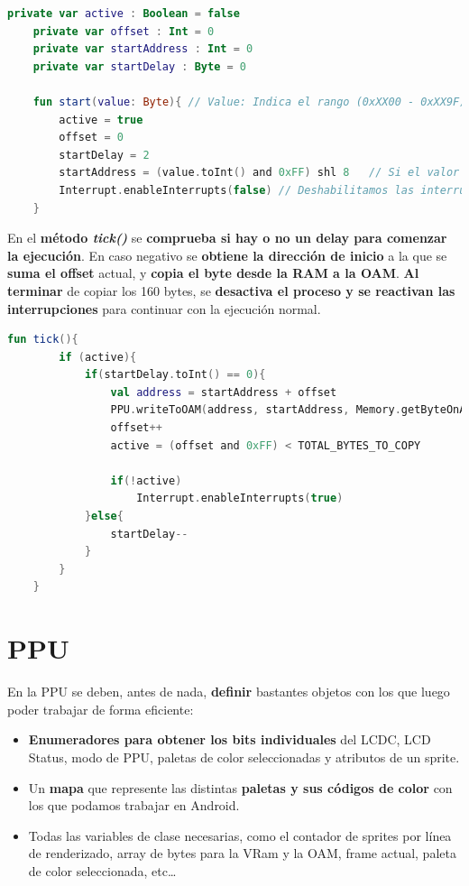\begin{lstlisting}[language=Kotlin, caption={Inicio del proceso DMA.}, label={code:dmainit}]
    private var active : Boolean = false
    private var offset : Int = 0
    private var startAddress : Int = 0
    private var startDelay : Byte = 0

    fun start(value: Byte){ // Value: Indica el rango (0xXX00 - 0xXX9F)
        active = true
        offset = 0
        startDelay = 2
        startAddress = (value.toInt() and 0xFF) shl 8   // Si el valor es 0xC0, la dirección será 0xC000
        Interrupt.enableInterrupts(false) // Deshabilitamos las interrupciones
    }
\end{lstlisting}

En el \textbf{método \textit{tick()}} se \textbf{comprueba si hay o no un delay para comenzar la ejecución}. En caso negativo se \textbf{obtiene la dirección de inicio} a la que se \textbf{suma el offset} actual, y \textbf{copia el byte desde la RAM a la OAM}. \textbf{Al terminar} de copiar los 160 bytes, se \textbf{desactiva el proceso y se reactivan las interrupciones} para continuar con la ejecución normal.

\begin{lstlisting}[language=Kotlin, caption={Proceso DMA.}, label={code:dmaprocess}]
    fun tick(){
        if (active){
            if(startDelay.toInt() == 0){
                val address = startAddress + offset
                PPU.writeToOAM(address, startAddress, Memory.getByteOnAddress(address))
                offset++
                active = (offset and 0xFF) < TOTAL_BYTES_TO_COPY

                if(!active)
                    Interrupt.enableInterrupts(true)
            }else{
                startDelay--
            }
        }
    }
\end{lstlisting}

\section{PPU}

En la PPU se deben, antes de nada, \textbf{definir} bastantes objetos con los que luego poder trabajar de forma eficiente:
\begin{itemize}
    \item \textbf{Enumeradores para obtener los bits individuales} del LCDC, LCD Status, modo de PPU, paletas de color seleccionadas y atributos de un sprite.
    \item Un \textbf{mapa} que represente las distintas \textbf{paletas y sus códigos de color} con los que podamos trabajar en Android.
    \item Todas las variables de clase necesarias, como el contador de sprites por línea de renderizado, array de bytes para la VRam y la OAM, frame actual, paleta de color seleccionada, etc\ldots
\end{itemize}

